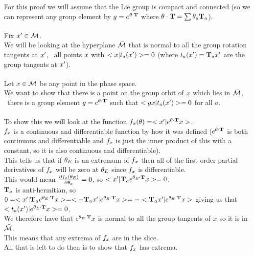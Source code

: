 {For this proof we will assume that the Lie group is compact and connected (so we can represent any group element by $g=e^{{\bf \theta} \cdot \mathbf{T}}$ where ${\bf \theta} \cdot \mathbf{T}=\sum {\bf \theta}_a \mathbf{T}_a$).\\
\\
\noindent Fix $x' \in {\cal M}$.\\
We will be looking at the hyperplane $\bar{{\cal M}}$ that is normal to all the group rotation tangents at $x'$, \ie\ all points $x$ with $<x|t_a(x')>=0$ (where $t_a(x')=\mathbf{T}_a x'$ are the group tangents at $x'$).\\
\\
Let $x \in {\cal M}$ be any point in the phase space.\\
We want to show that there is a point on the group orbit of $x$ which lies in $\bar{{\cal M}}$, \ie\ there is a group element $g=e^{{\bf \theta} \cdot \mathbf{T}}$ such that $<g x|t_a(x')>=0$ for all $a$.\\
\\
To show this we will look at the function $f_{x}({\bf \theta})=<x'|e^{{\bf \theta} \cdot \mathbf{T}} x>$.\\
$f_{x}$ is a continuous and differentiable function by how it was defined ($e^{{\bf \theta} \cdot \mathbf{T}}$ is both continuous and differentiable and $f_{x}$ is just the inner product of this with a constant, so it is also continuous and differentiable).\\
This tells us that if ${\bf \theta}_E$ is an extremum of $f_{x}$ then all of the first order partial derivatives of $f_{x}$ will be zero at ${\bf \theta}_E$ since $f_{x}$ is differentiable.\\
This would mean $\frac{\partial f_{x}({\bf \theta}_E)}{\partial {\bf \theta}_a}=0$, so $<x'|\mathbf{T}_a e^{{\bf \theta}_E \cdot \mathbf{T}} x>=0$.\\
$\mathbf{T}_a$ is anti-hermitian, so $0=<x'|\mathbf{T}_a e^{{\bf \theta}_E \cdot \mathbf{T}} x>=<-\mathbf{T}_a x'|e^{{\bf \theta}_E \cdot \mathbf{T}} x>=-<\mathbf{T}_a x'|e^{{\bf \theta}_E \cdot \mathbf{T}} x>$ giving us that $<t_a(x')|e^{{\bf \theta}_E \cdot \mathbf{T}} x>=0$.\\
We therefore have that $e^{{\bf \theta}_E \cdot \mathbf{T}} x$ is normal to all the group tangents of $x$ so it is in $\bar{{\cal M}}$.\\
This means that any extrema of $f_{x}$ are in the slice.\\
All that is left to do then is to show that $f_{x}$ has extrema.\\
\\
}

